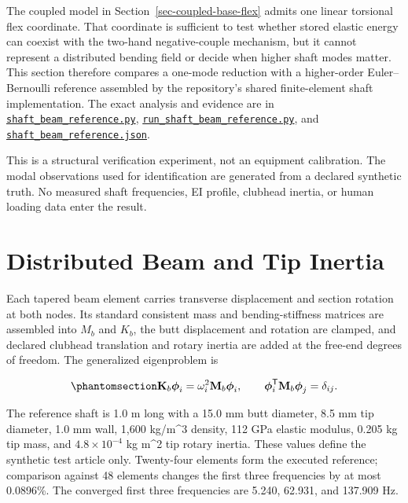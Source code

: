 \documentclass[
  letterpaper,
]{report}
\begin{document}
The coupled model in Section~\ref{sec-coupled-base-flex} admits one
linear torsional flex coordinate. That coordinate is sufficient to test
whether stored elastic energy can coexist with the two-hand
negative-couple mechanism, but it cannot represent a distributed bending
field or decide when higher shaft modes matter. This section therefore
compares a one-mode reduction with a higher-order Euler--Bernoulli
reference assembled by the repository's shared finite-element shaft
implementation. The exact analysis and evidence are in
\href{https://github.com/D-sorganization/UpstreamDrift/blob/main/scripts/research/proximal_distal_energy/shaft_beam_reference.py}{\texttt{shaft\_beam\_reference.py}},
\href{https://github.com/D-sorganization/UpstreamDrift/blob/main/scripts/research/proximal_distal_energy/run_shaft_beam_reference.py}{\texttt{run\_shaft\_beam\_reference.py}},
and
\href{https://github.com/D-sorganization/UpstreamDrift/blob/main/docs/research/proximal_distal_energy_transfer/data/shaft_beam_reference.json}{\texttt{shaft\_beam\_reference.json}}.

This is a structural verification experiment, not an equipment
calibration. The modal observations used for identification are
generated from a declared synthetic truth. No measured shaft
frequencies, EI profile, clubhead inertia, or human loading data enter
the result.

\section{Distributed Beam and Tip
Inertia}\label{distributed-beam-and-tip-inertia}

Each tapered beam element carries transverse displacement and section
rotation at both nodes. Its standard consistent mass and
bending-stiffness matrices are assembled into \(M_b\) and \(K_b\), the
butt displacement and rotation are clamped, and declared clubhead
translation and rotary inertia are added at the free-end degrees of
freedom. The generalized eigenproblem is

\begin{equation}\phantomsection\label{eq-beam-eigenproblem}{
\mathbf K_b\boldsymbol\phi_i
=\omega_i^2\mathbf M_b\boldsymbol\phi_i,
\qquad
\boldsymbol\phi_i^\mathsf T\mathbf M_b\boldsymbol\phi_j=\delta_{ij}.
}\end{equation}

The reference shaft is 1.0 m long with a 15.0 mm butt diameter, 8.5 mm
tip diameter, 1.0 mm wall, 1,600 kg/m\^{}3 density, 112 GPa elastic
modulus, 0.205 kg tip mass, and \(4.8\times10^{-4}\) kg m\^{}2 tip
rotary inertia. These values define the synthetic test article only.
Twenty-four elements form the executed reference; comparison against 48
elements changes the first three frequencies by at most 0.0896\%. The
converged first three frequencies are 5.240, 62.931, and 137.909 Hz.
\end{document}

